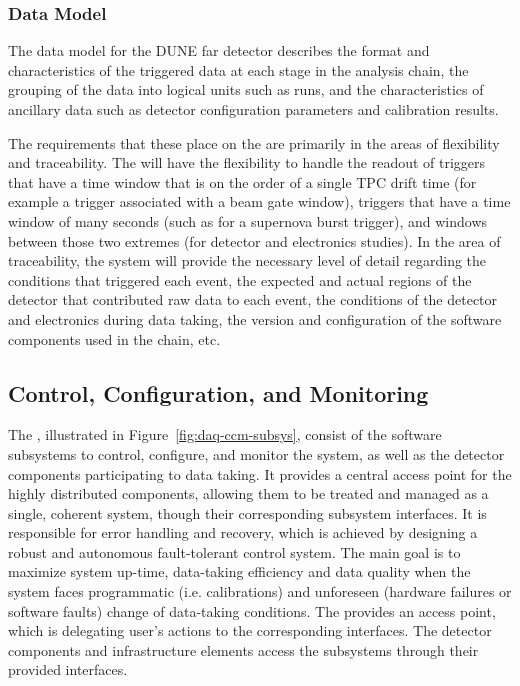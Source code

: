 \subsubsection{Data Model}
\label{sec:fd-daq:design-data-model}

The data model for the DUNE far detector describes the format and characteristics of the triggered data at each stage in the analysis chain, the grouping of the data into logical units such as runs, and the characteristics of ancillary data such as detector configuration parameters and calibration results.

The requirements that these place on the  are primarily in the areas of flexibility and traceability.  The  will have the flexibility to handle the readout of triggers that have a time window that is on the order of a single TPC drift time (for example a trigger associated with a beam gate window), triggers that have a time window of many seconds (such as for a supernova burst trigger), and windows between those two extremes (for detector and electronics studies).  In the area of traceability, the  system will provide the necessary level of detail regarding the conditions that triggered each event, the expected and actual regions of the detector that contributed raw data to each event, the conditions of the detector and electronics during data taking, the version and configuration of the software components used in the  chain, etc.

\subsection{Control, Configuration, and Monitoring}
\label{sec:fd-daq:design-run-control}

The , illustrated in Figure~\ref{fig:daq-ccm-subsys}, consist of the software
subsystems to control, configure, and monitor the  system, as well as the detector components
participating to data taking. It provides a central access point for the highly distributed 
components, allowing them to be treated and managed as a single, coherent system, though their
corresponding subsystem interfaces. It is responsible for error handling and recovery, which is
achieved by designing a robust and autonomous fault-tolerant control system. The main goal is to
maximize system up-time, data-taking efficiency and data quality when the system faces programmatic
(i.e. calibrations) and unforeseen (hardware failures or software faults) change of data-taking
conditions. The  provides an access point, which is delegating user's actions to the
corresponding interfaces. The detector components and infrastructure elements access the 
subsystems through their provided interfaces. 

